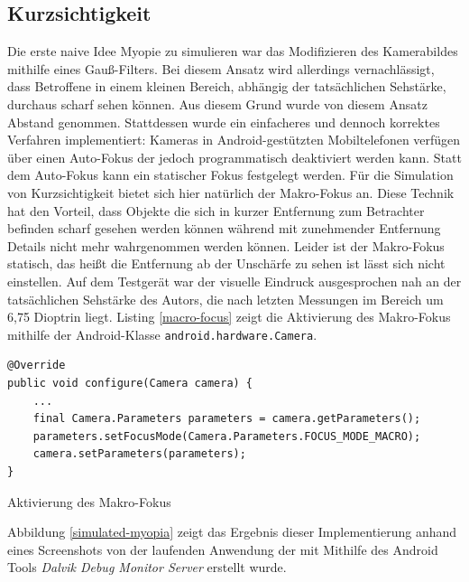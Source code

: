 \documentclass[a4paper]{article}
\begin{document}
\subsection*{Kurzsichtigkeit}
Die erste naive Idee Myopie zu simulieren war das Modifizieren des Kamerabildes mithilfe eines Gauß-Filters. Bei diesem Ansatz wird allerdings vernachlässigt, dass Betroffene in einem kleinen Bereich, abhängig der tatsächlichen Sehstärke, durchaus scharf sehen können. Aus diesem Grund wurde von diesem Ansatz Abstand genommen. Stattdessen wurde ein einfacheres und dennoch korrektes Verfahren implementiert: Kameras in Android-gestützten Mobiltelefonen verfügen über einen Auto-Fokus der jedoch programmatisch deaktiviert werden kann. Statt dem Auto-Fokus kann ein statischer Fokus festgelegt werden. Für die Simulation von Kurzsichtigkeit bietet sich hier natürlich der Makro-Fokus an. Diese Technik hat den Vorteil, dass Objekte die sich in kurzer Entfernung zum Betrachter befinden scharf gesehen werden können während mit zunehmender Entfernung Details nicht mehr wahrgenommen werden können. Leider ist der Makro-Fokus statisch, das heißt die Entfernung ab der Unschärfe zu sehen ist lässt sich nicht einstellen. Auf dem Testgerät war der visuelle Eindruck ausgesprochen nah an der tatsächlichen Sehstärke des Autors, die nach letzten Messungen im Bereich um 6,75 Dioptrin liegt. Listing \ref{macro-focus} zeigt die Aktivierung des Makro-Fokus mithilfe der Android-Klasse \texttt{android.hardware.Camera}.

\begin{listing}[H]
\begin{verbatim}
@Override
public void configure(Camera camera) {
    ...
    final Camera.Parameters parameters = camera.getParameters();
    parameters.setFocusMode(Camera.Parameters.FOCUS_MODE_MACRO);
    camera.setParameters(parameters);
}
\end{verbatim}
\caption{Aktivierung des Makro-Fokus}
\label{macro-focus}
\end{listing}

Abbildung \ref{simulated-myopia} zeigt das Ergebnis dieser Implementierung anhand eines Screenshots von der laufenden Anwendung der mit Mithilfe des Android Tools \textit{Dalvik Debug Monitor Server} erstellt wurde.
\end{document}
